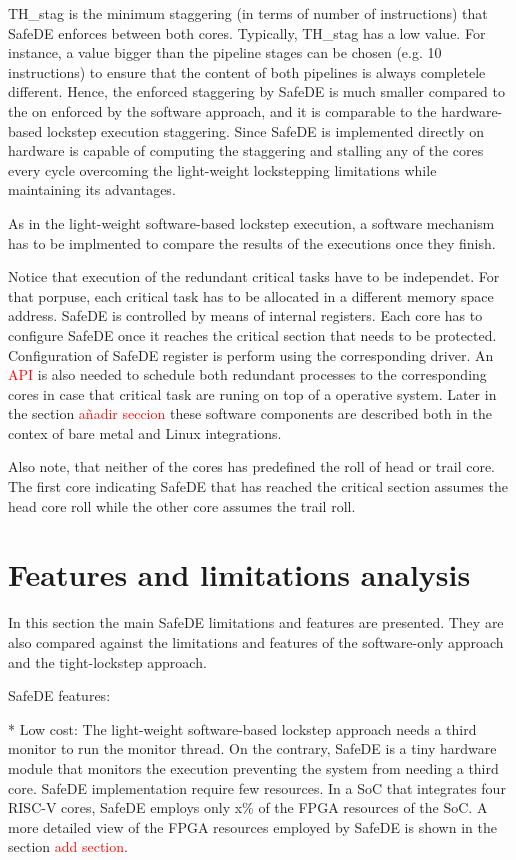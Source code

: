 TH\_stag is the minimum staggering (in terms of number of instructions) that SafeDE enforces between both cores. Typically, TH\_stag has a low value. For instance, a value bigger than the pipeline stages can be chosen (e.g. 10 instructions) to ensure that the content of both pipelines is always completele different. Hence, the enforced staggering by SafeDE is much smaller compared to the on enforced by the software approach, and it is comparable to the hardware-based lockstep execution staggering. Since SafeDE is implemented directly on hardware is capable of computing the staggering and stalling any of the cores every cycle overcoming the light-weight lockstepping limitations while maintaining its advantages.

As in the light-weight software-based lockstep execution, a software mechanism has to be implmented to compare the results of the executions once they finish. 

Notice that execution of the redundant critical tasks have to be independet. For that porpuse, each critical task has to be allocated in a different memory space address. SafeDE is controlled by means of internal registers. Each core has to configure SafeDE once it reaches the critical section that needs to be protected. Configuration of SafeDE register is perform using the corresponding driver. An \textcolor{red}{API} is also needed to schedule both redundant processes to the corresponding cores in case that critical task are runing on top of a operative system. Later in the section \textcolor{red}{añadir seccion} these software components are described both in the contex of bare metal and Linux integrations.

Also note, that neither of the cores has predefined the roll of head or trail core. The first core indicating SafeDE that has reached the critical section assumes the head core roll while the other core assumes the trail roll.

\section{Features and limitations analysis}

In this section the main SafeDE limitations and features are presented. They are also compared against the limitations and features of the software-only approach and the tight-lockstep approach.

SafeDE features:

* Low cost: The light-weight software-based lockstep approach needs a third monitor to run the monitor thread. On the contrary, SafeDE is a tiny hardware module that monitors the execution preventing the system from needing a third core. SafeDE implementation require few resources. In a SoC that integrates four RISC-V cores, SafeDE employs only x\% of the FPGA resources of the SoC. A more detailed view of the FPGA resources employed by SafeDE is shown in the section \textcolor{red}{add section}.

